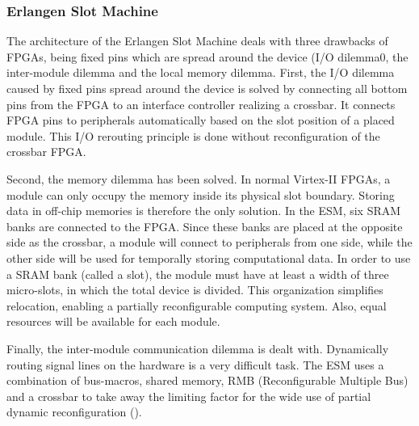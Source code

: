 \subsubsection{Erlangen Slot Machine}
The architecture of \cite{erlangen} the Erlangen Slot Machine deals with three drawbacks of FPGAs, being fixed pins which are spread around the device (I/O dilemma0, the inter-module dilemma and the local memory dilemma. First, the I/O dilemma caused by fixed pins spread around the device is solved by connecting all bottom pins from the FPGA to an interface controller realizing a crossbar. It connects FPGA pins to peripherals automatically based on the slot position of a placed module. This I/O rerouting principle is done without reconfiguration of the crossbar FPGA.

Second, the memory dilemma has been solved. In normal Virtex-II FPGAs, a module can only occupy the memory inside its physical slot boundary. Storing data in off-chip memories is therefore the only solution. In the ESM, six SRAM banks are connected to the FPGA. Since these banks are placed at the opposite side as the crossbar, a module will connect to peripherals from one side, while the other side will be used for temporally storing computational data. In order to use a SRAM bank (called a slot), the module must have at least a width of three micro-slots, in which the total device is divided. This organization simplifies relocation, enabling a partially reconfigurable computing system. Also, equal resources will be available for each module.

Finally, the inter-module communication dilemma is dealt with. Dynamically routing signal lines on the hardware is a very difficult task. The ESM uses a combination of bus-macros, shared memory, RMB (Reconfigurable Multiple Bus) and a crossbar to take away the limiting factor for the wide use of partial dynamic reconfiguration (\cite{erlangen}).